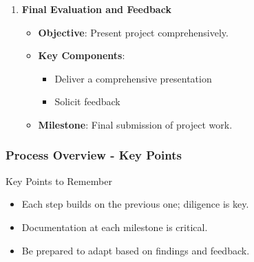 \documentclass[aspectratio=169]{beamer}
\begin{document}
\begin{frame}[fragile]
\begin{enumerate}
    \item \textbf{Final Evaluation and Feedback}
      \begin{itemize}
        \item \textbf{Objective}: Present project comprehensively.
        \item \textbf{Key Components}:
          \begin{itemize}
            \item Deliver a comprehensive presentation
            \item Solicit feedback
          \end{itemize}
        \item \textbf{Milestone}: Final submission of project work.
      \end{itemize}
  \end{enumerate}
\end{frame}

\begin{frame}[fragile]
  \frametitle{Process Overview - Key Points}
  \begin{block}{Key Points to Remember}
    \begin{itemize}
      \item Each step builds on the previous one; diligence is key.
      \item Documentation at each milestone is critical.
      \item Be prepared to adapt based on findings and feedback.
    \end{itemize}
  \end{block}
\end{frame}
\end{document}
